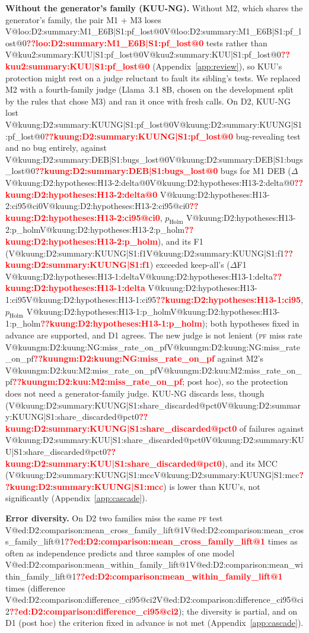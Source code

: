 \documentclass[pdflatex,iicol,sn-mathphys-num]{sn-jnl}
\makeatletter
\newcommand{\V}[1]{\ifcsname V@#1\endcsname\csname V@#1\endcsname\else\textbf{\textcolor{red}{??#1}}\fi}
\newcommand{\PF}{\textsc{pf}}
\makeatother
\begin{document}
\textbf{Without the generator's family (KUU-NG).} Without M2, which shares the generator's family, the pair M1 + M3 loses \V{loo:D2:summary:M1_E6B|S1:pf_lost@0} tests rather than \V{kuu2:summary:KUU|S1:pf_lost@0} (Appendix~\ref{app:review}), so KUU's protection might rest on a judge reluctant to fault its sibling's tests. We replaced M2 with a fourth-family judge (Llama~3.1 8B, chosen on the development split by the rules that chose M3) and ran it once with fresh calls. On D2, KUU-NG lost \V{kuung:D2:summary:KUUNG|S1:pf_lost@0} bug-revealing test and no bug entirely, against \V{kuung:D2:summary:DEB|S1:bugs_lost@0} bugs for M1 DEB ($\Delta$ \V{kuung:D2:hypotheses:H13-2:delta@0} \V{kuung:D2:hypotheses:H13-2:ci95@ci0}, $p_\mathrm{Holm}$ \V{kuung:D2:hypotheses:H13-2:p_holm}), and its F1 (\V{kuung:D2:summary:KUUNG|S1:f1}) exceeded keep-all's ($\Delta$F1 \V{kuung:D2:hypotheses:H13-1:delta} \V{kuung:D2:hypotheses:H13-1:ci95}, $p_\mathrm{Holm}$ \V{kuung:D2:hypotheses:H13-1:p_holm}); both hypotheses fixed in advance are supported, and D1 agrees. The new judge is not lenient (\PF{} miss rate \V{kuungm:D2:kuung:NG:miss_rate_on_pf} against M2's \V{kuungm:D2:kuu:M2:miss_rate_on_pf}; post hoc), so the protection does not need a generator-family judge. KUU-NG discards less, though (\V{kuung:D2:summary:KUUNG|S1:share_discarded@pct0} of failures against \V{kuung:D2:summary:KUU|S1:share_discarded@pct0}), and its MCC (\V{kuung:D2:summary:KUUNG|S1:mcc}) is lower than KUU's, not significantly (Appendix~\ref{app:cascade}).

\textbf{Error diversity.} On D2 two families miss the same \PF{} test \V{ed:D2:comparison:mean_cross_family_lift@1} times as often as independence predicts and three samples of one model \V{ed:D2:comparison:mean_within_family_lift@1} times (difference \V{ed:D2:comparison:difference_ci95@ci2}); the diversity is partial, and on D1 (post hoc) the criterion fixed in advance is not met (Appendix~\ref{app:cascade}).
\end{document}
